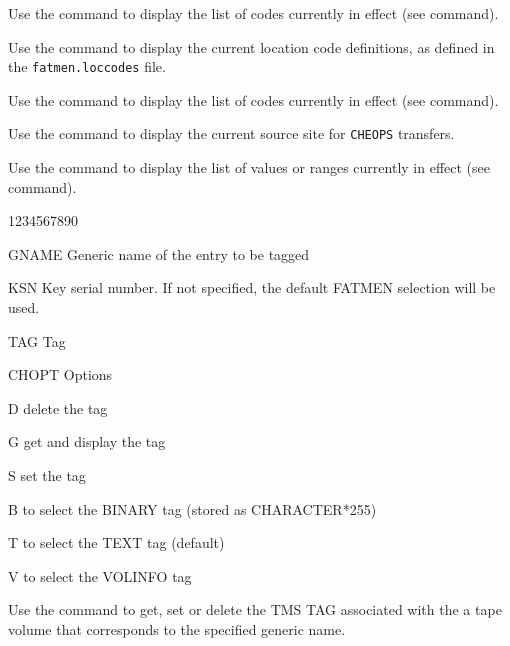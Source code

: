 
Use the  command to display the list of 
 codes currently in effect
(see  command).


Use the  command to display the current
location code definitions, as defined in the {\tt fatmen.loccodes}
file.


Use the  command to display the list of 
 codes currently in effect
(see  command).


Use the  command to display the current
source site for {\tt CHEOPS} transfers.


Use the  command to display the list of 
 values or ranges currently in effect
(see  command).

\begin{DLtt}{1234567890}
\item[GNAME]Generic name of the entry to be tagged
\item[KSN]Key serial number. If not specified, the default FATMEN
selection will be used.
\item[TAG]Tag
\item[CHOPT]Options
\begin{DLtt}{12}
\item[D]delete the tag
\item[G]get and display the tag
\item[S]set the tag
\item[B]to select the BINARY  tag (stored as CHARACTER*255)
\item[T]to select the TEXT    tag (default)
\item[V]to select the VOLINFO tag 
\end{DLtt}
\end{DLtt}
Use the  command to get, set or delete the TMS TAG
associated with the a tape volume that corresponds to
the specified generic name.

